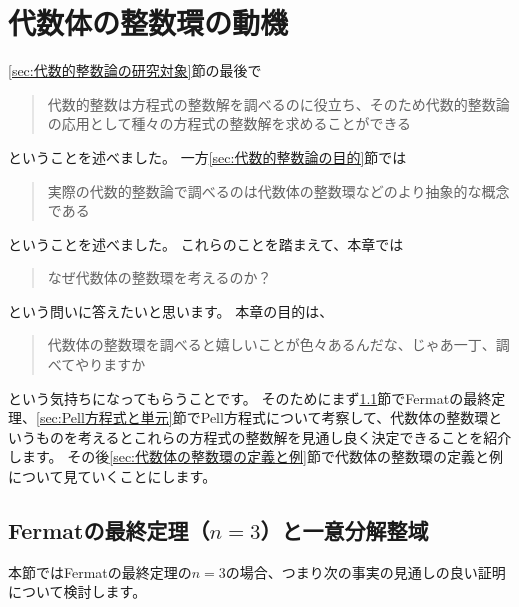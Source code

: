 \documentclass[11pt,b5paper,oneside,titlepage,lualatex]{ltjsreport}
\begin{document}
\clearpage





\chapter{代数体の整数環の動機} \label{chap:代数体の整数環の動機}


\ref{sec:代数的整数論の研究対象}節の最後で
\begin{quote}
	\centering
	代数的整数は方程式の整数解を調べるのに役立ち、そのため代数的整数論の応用として種々の方程式の整数解を求めることができる
\end{quote}
ということを述べました。
一方\ref{sec:代数的整数論の目的}節では
\begin{quote}
	\centering
	実際の代数的整数論で調べるのは代数体の整数環などのより抽象的な概念である
\end{quote}
ということを述べました。
これらのことを踏まえて、本章では
\begin{quote}
	\centering
	なぜ代数体の整数環を考えるのか？
\end{quote}
という問いに答えたいと思います。
本章の目的は、
\begin{quote}
	\centering
	代数体の整数環を調べると嬉しいことが色々あるんだな、じゃあ一丁、調べてやりますか
\end{quote}
という気持ちになってもらうことです。
そのためにまず\ref{sec:Fermatの最終定理と一意分解整域}節でFermatの最終定理、\ref{sec:Pell方程式と単元}節でPell方程式について考察して、代数体の整数環というものを考えるとこれらの方程式の整数解を見通し良く決定できることを紹介します。
その後\ref{sec:代数体の整数環の定義と例}節で代数体の整数環の定義と例について見ていくことにします。


\section{Fermatの最終定理（$ n=3 $）と一意分解整域} \label{sec:Fermatの最終定理と一意分解整域}


本節ではFermatの最終定理の$ n=3 $の場合、つまり次の事実の見通しの良い証明について検討します。
\end{document}
